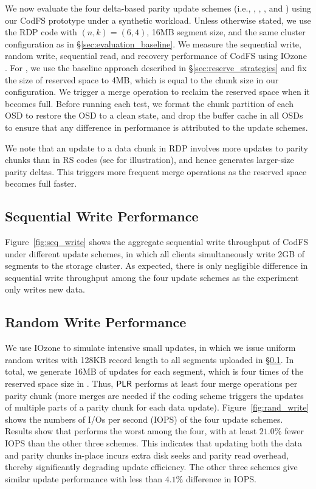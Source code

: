 We now evaluate the four delta-based parity update schemes (i.e., \FO, \FL, 
\PL, and \PLR) using our CodFS prototype under a synthetic workload.  Unless
otherwise stated, we use the RDP code \cite{corbett04} with $(n,k) = (6,4)$,
16MB segment size, and the same cluster configuration as in
\S\ref{sec:evaluation_baseline}.  We measure the sequential write, random
write, sequential read, and recovery performance of CodFS using IOzone
\cite{iozone}. For \PLR, we use the baseline approach described in
\S\ref{sec:reserve_strategies} and fix the size of reserved space to 4MB,
which is equal to the chunk size in our configuration. We trigger a merge
operation to reclaim the reserved space when it becomes full.
Before running each test, we format the chunk partition of each OSD to
restore the OSD to a clean state, and drop the buffer cache in all OSDs to
ensure that any difference in performance is attributed to the update schemes.

We note that an update to a data chunk in RDP \cite{corbett04} involves more
updates to parity chunks than in RS codes (see \cite{plank13} for illustration),
and hence generates larger-size parity deltas.  This triggers more frequent
merge operations as the reserved space becomes full faster. 

\subsection{Sequential Write Performance}
\label{eval:seq_write}

Figure~\ref{fig:seq_write} shows the aggregate sequential write throughput of
CodFS under different update schemes, in which all clients simultaneously
write 2GB of segments to the storage cluster.  As expected, there is only
negligible difference in sequential write throughput among the four update
schemes as the experiment only writes new data.

\subsection{Random Write Performance}
\label{eval:rand_write}

We use IOzone to simulate intensive small updates, in which we issue uniform
random writes with 128KB record length to all segments uploaded in
\S\ref{eval:seq_write}.  In total, we generate 16MB of updates for each
segment, which is four times of the reserved space size in \PLR.  Thus, $\textsf{PLR}$
performs at least four merge operations per parity chunk (more merges are
needed if the coding scheme triggers the updates of multiple parts of a parity
chunk for each data update). 
Figure~\ref{fig:rand_write} shows the numbers of I/Os per second (IOPS) 
of the four update schemes.  Results show that \FO performs the worst among
the four, with at least $21.0\%$ fewer IOPS than the other three schemes. This
indicates that updating both the data and parity chunks in-place incurs extra
disk seeks and parity read overhead, thereby significantly degrading update
efficiency.  The other three schemes give similar update performance with less
than ${4.1}\%$ difference in IOPS.


